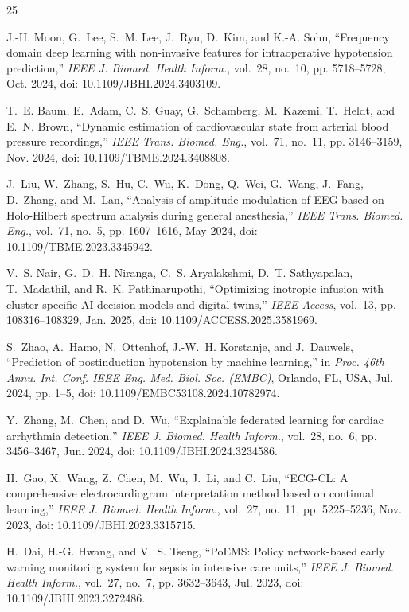 \documentclass[conference]{IEEEtran}
\begin{document}
\begin{thebibliography}{25}

J.-H. Moon, G.~Lee, S.~M. Lee, J.~Ryu, D.~Kim, and K.-A. Sohn, ``Frequency domain deep learning with non-invasive features for intraoperative hypotension prediction,'' \emph{IEEE J. Biomed. Health Inform.}, vol.~28, no.~10, pp. 5718--5728, Oct. 2024, doi: 10.1109/JBHI.2024.3403109.

T.~E. Baum, E.~Adam, C.~S. Guay, G.~Schamberg, M.~Kazemi, T.~Heldt, and E.~N. Brown, ``Dynamic estimation of cardiovascular state from arterial blood pressure recordings,'' \emph{IEEE Trans. Biomed. Eng.}, vol.~71, no.~11, pp. 3146--3159, Nov. 2024, doi: 10.1109/TBME.2024.3408808.

J.~Liu, W.~Zhang, S.~Hu, C.~Wu, K.~Dong, Q.~Wei, G.~Wang, J.~Fang, D.~Zhang, and M.~Lan, ``Analysis of amplitude modulation of EEG based on Holo-Hilbert spectrum analysis during general anesthesia,'' \emph{IEEE Trans. Biomed. Eng.}, vol.~71, no.~5, pp. 1607--1616, May 2024, doi: 10.1109/TBME.2023.3345942.

V.~S. Nair, G.~D.~H. Niranga, C.~S. Aryalakshmi, D.~T. Sathyapalan, T.~Madathil, and R.~K. Pathinarupothi, ``Optimizing inotropic infusion with cluster specific AI decision models and digital twins,'' \emph{IEEE Access}, vol.~13, pp. 108316--108329, Jan. 2025, doi: 10.1109/ACCESS.2025.3581969.

S.~Zhao, A.~Hamo, N.~Ottenhof, J.-W.~H. Korstanje, and J.~Dauwels, ``Prediction of postinduction hypotension by machine learning,'' in \emph{Proc. 46th Annu. Int. Conf. IEEE Eng. Med. Biol. Soc. (EMBC)}, Orlando, FL, USA, Jul. 2024, pp. 1--5, doi: 10.1109/EMBC53108.2024.10782974.

Y.~Zhang, M.~Chen, and D.~Wu, ``Explainable federated learning for cardiac arrhythmia detection,'' \emph{IEEE J. Biomed. Health Inform.}, vol.~28, no.~6, pp. 3456--3467, Jun. 2024, doi: 10.1109/JBHI.2024.3234586.

H.~Gao, X.~Wang, Z.~Chen, M.~Wu, J.~Li, and C.~Liu, ``ECG-CL: A comprehensive electrocardiogram interpretation method based on continual learning,'' \emph{IEEE J. Biomed. Health Inform.}, vol.~27, no.~11, pp. 5225--5236, Nov. 2023, doi: 10.1109/JBHI.2023.3315715.

H.~Dai, H.-G. Hwang, and V.~S. Tseng, ``PoEMS: Policy network-based early warning monitoring system for sepsis in intensive care units,'' \emph{IEEE J. Biomed. Health Inform.}, vol.~27, no.~7, pp. 3632--3643, Jul. 2023, doi: 10.1109/JBHI.2023.3272486.


\end{thebibliography}
\end{document}
